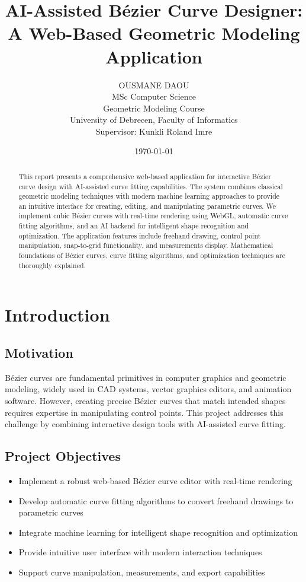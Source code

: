 \documentclass[12pt,a4paper]{article}
\title{\textbf{AI-Assisted Bézier Curve Designer:\\A Web-Based Geometric Modeling Application}}
\author{OUSMANE DAOU\\
MSc Computer Science\\
Geometric Modeling Course\\
University of Debrecen, Faculty of Informatics\\
Supervisor: Kunkli Roland Imre}
\date{\today}
\begin{document}
\maketitle

\begin{abstract}
This report presents a comprehensive web-based application for interactive Bézier curve design with AI-assisted curve fitting capabilities. The system combines classical geometric modeling techniques with modern machine learning approaches to provide an intuitive interface for creating, editing, and manipulating parametric curves. We implement cubic Bézier curves with real-time rendering using WebGL, automatic curve fitting algorithms, and an AI backend for intelligent shape recognition and optimization. The application features include freehand drawing, control point manipulation, snap-to-grid functionality, and measurements display. Mathematical foundations of Bézier curves, curve fitting algorithms, and optimization techniques are thoroughly explained.
\end{abstract}

\tableofcontents
\newpage

\section{Introduction}

\subsection{Motivation}
Bézier curves are fundamental primitives in computer graphics and geometric modeling, widely used in CAD systems, vector graphics editors, and animation software. However, creating precise Bézier curves that match intended shapes requires expertise in manipulating control points. This project addresses this challenge by combining interactive design tools with AI-assisted curve fitting.

\subsection{Project Objectives}
\begin{itemize}
    \item Implement a robust web-based Bézier curve editor with real-time rendering
    \item Develop automatic curve fitting algorithms to convert freehand drawings to parametric curves
    \item Integrate machine learning for intelligent shape recognition and optimization
    \item Provide intuitive user interface with modern interaction techniques
    \item Support curve manipulation, measurements, and export capabilities
\end{itemize}
\end{document}
